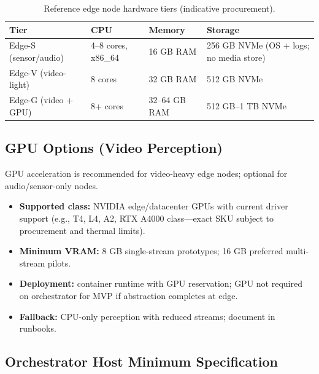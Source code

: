 \begin{table}[htbp]
  \centering
  \caption{Reference edge node hardware tiers (indicative procurement).}
  \label{tab:edge-hardware-appendix}
  \small
  \begin{tabular}{@{}p{2.4cm}p{3.6cm}p{3.6cm}p{3.2cm}@{}}
    \toprule
    Tier & CPU & Memory & Storage \\
    \midrule
    Edge-S (sensor/audio) &
      4--8 cores, x86\_64 &
      16 GB RAM &
      256 GB NVMe (OS + logs; no media store) \\
    Edge-V (video-light) &
      8 cores &
      32 GB RAM &
      512 GB NVMe \\
    Edge-G (video + GPU) &
      8+ cores &
      32--64 GB RAM &
      512 GB--1 TB NVMe \\
    \bottomrule
  \end{tabular}
\end{table}

\subsection{GPU Options (Video Perception)}

GPU acceleration is recommended for video-heavy edge nodes; optional for audio/sensor-only nodes.

\begin{itemize}[noitemsep]
  \item \textbf{Supported class:} NVIDIA edge/datacenter GPUs with current driver support
        (e.g., T4, L4, A2, RTX A4000 class---exact SKU subject to procurement and thermal limits).
  \item \textbf{Minimum VRAM:} 8 GB single-stream prototypes; 16 GB preferred multi-stream pilots.
  \item \textbf{Deployment:} container runtime with GPU reservation; GPU not required on orchestrator
        for MVP if abstraction completes at edge.
  \item \textbf{Fallback:} CPU-only perception with reduced streams; document in runbooks.
\end{itemize}

\subsection{Orchestrator Host Minimum Specification}

